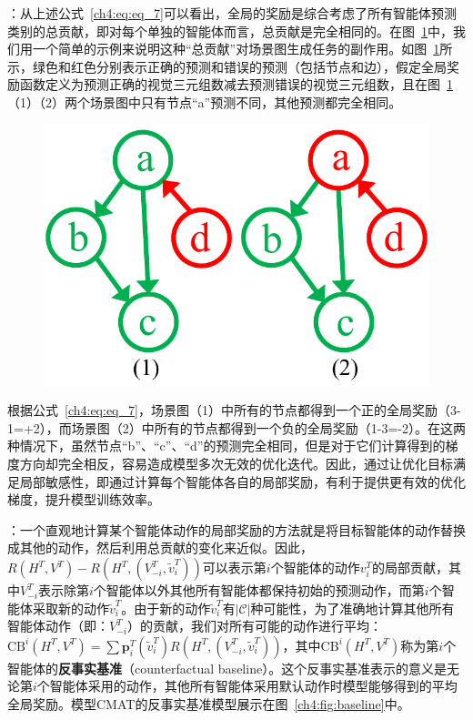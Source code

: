 \textbf{}：从上述公式~\eqref{ch4:eq:eq_7}可以看出，全局的奖励是综合考虑了所有智能体预测类别的总贡献，即对每个单独的智能体而言，总贡献是完全相同的。在图~\ref{ch4:fig:local_sensitive}中，我们用一个简单的示例来说明这种“总贡献”对场景图生成任务的副作用。如图~\ref{ch4:fig:local_sensitive}所示，绿色和红色分别表示正确的预测和错误的预测（包括节点和边），假定全局奖励函数定义为预测正确的视觉三元组数减去预测错误的视觉三元组数，且在图~\ref{ch4:fig:local_sensitive}（1）（2）两个场景图中只有节点“a”预测不同，其他预测都完全相同。

\begin{figure}
    \centering
        \includegraphics[width=0.9\linewidth]{chapter4/res/local_sensitive.pdf}
    \label{ch4:fig:local_sensitive}
\end{figure}

根据公式~\eqref{ch4:eq:eq_7}，场景图（1）中所有的节点都得到一个正的全局奖励（3-1=+2），而场景图（2）中所有的节点都得到一个负的全局奖励（1-3=-2）。在这两种情况下，虽然节点“b”、“c”、“d”的预测完全相同，但是对于它们计算得到的梯度方向却完全相反，容易造成模型多次无效的优化迭代。因此，通过让优化目标满足局部敏感性，即通过计算每个智能体各自的局部奖励，有利于提供更有效的优化梯度，提升模型训练效率。

\textbf{}：一个直观地计算某个智能体动作的局部奖励的方法就是将目标智能体的动作替换成其他的动作，然后利用总贡献的变化来近似。因此，$R(H^T, V^T) - R(H^T, (V^T_{-i}, \tilde{v}^T_i))$可以表示第$i$个智能体的动作$v^T_i$的局部贡献，其中$V^T_{-i}$表示除第$i$个智能体以外其他所有智能体都保持初始的预测动作，而第$i$个智能体采取新的动作$\tilde{v}^T_i$。由于新的动作$\tilde{v}^T_i$有$|\mathcal{C}|$种可能性，为了准确地计算其他所有智能体动作（即：$V^T_{-i}$）的贡献，我们对所有可能的动作进行平均：$ \text{CB}^i(H^T, V^T) = \sum \bm{p}^T_i(\tilde{v}^T_i) R(H^T, (V^T_{-i}, \tilde{v}^T_i))$，其中$\text{CB}^i(H^T, V^T)$称为第$i$个智能体的\textbf{反事实基准}（counterfactual baseline）。这个反事实基准表示的意义是无论第$i$个智能体采用的动作，其他所有智能体采用默认动作时模型能够得到的平均全局奖励。模型CMAT的反事实基准模型展示在图~\ref{ch4:fig:baseline}中。

